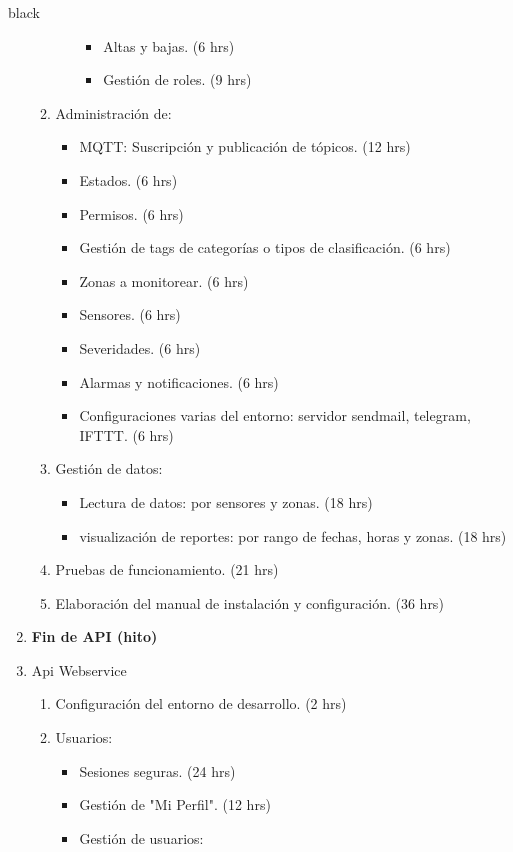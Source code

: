 \documentclass[11pt]{charter}
\begin{document}
\begin{consigna}{black}
\begin{enumerate}
\begin{enumerate}
\begin{itemize}
\begin{itemize}
					\item Altas y bajas. (6 hrs) 
					\item Gestión de roles. (9 hrs)
				\end{itemize}
			\end{itemize}
		\item Administración de:
			\begin{itemize}
				\item MQTT: Suscripción y publicación de tópicos. (12 hrs) 
				\item Estados. (6 hrs)
				\item Permisos. (6 hrs)  
				\item Gestión de tags de categorías o tipos de clasificación. (6 hrs) 
				\item Zonas a monitorear. (6 hrs) 
				\item Sensores. (6 hrs)
 				\item Severidades. (6 hrs)
				\item Alarmas y notificaciones. (6 hrs) 
				\item Configuraciones varias del entorno: servidor sendmail, telegram, IFTTT. (6 hrs)
			\end{itemize}
		\item Gestión de datos:
			\begin{itemize}
				\item Lectura de datos: por sensores y zonas. (18 hrs) 
				\item visualización de reportes: por rango de fechas, horas y zonas. (18 hrs) 
			\end{itemize}
		\item Pruebas de funcionamiento. (21 hrs) 
		\item Elaboración del manual de instalación y configuración. (36 hrs)  	
	\end{enumerate}
\item \textbf{Fin de API (hito)} 	
\item Api Webservice
	\begin{enumerate}
		\item Configuración del entorno de desarrollo. (2 hrs)
		\item Usuarios:
			\begin{itemize}
				\item Sesiones seguras. (24 hrs)
				\item Gestión de "Mi Perfil". (12 hrs)
				\item Gestión de usuarios:
				\begin{itemize}

\end{itemize}
\end{itemize}
\end{enumerate}
\end{enumerate}
\end{consigna}
\end{document}
